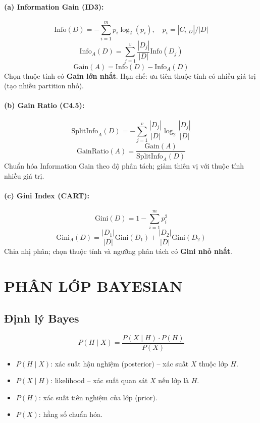 \documentclass[10pt]{article}
\begin{document}
\paragraph{(a) Information Gain (ID3):}
\[
\text{Info}(D) = -\sum_{i=1}^{m} p_i \log_2(p_i), \quad p_i = |C_{i,D}|/|D|
\]
\[
\text{Info}_A(D) = \sum_{j=1}^{v} \frac{|D_j|}{|D|} \text{Info}(D_j)
\]
\[
\text{Gain}(A) = \text{Info}(D) - \text{Info}_A(D)
\]
Chọn thuộc tính có \textbf{Gain lớn nhất}. Hạn chế: ưu tiên thuộc tính có nhiều giá trị (tạo nhiều partition nhỏ).

\paragraph{(b) Gain Ratio (C4.5):}
\[
\text{SplitInfo}_A(D) = -\sum_{j=1}^{v} \frac{|D_j|}{|D|} \log_2\frac{|D_j|}{|D|}
\]
\[
\text{GainRatio}(A) = \frac{\text{Gain}(A)}{\text{SplitInfo}_A(D)}
\]
Chuẩn hóa Information Gain theo độ phân tách; giảm thiên vị với thuộc tính nhiều giá trị.

\paragraph{(c) Gini Index (CART):}
\[
\text{Gini}(D) = 1 - \sum_{i=1}^{m} p_i^2
\]
\[
\text{Gini}_A(D) = \frac{|D_1|}{|D|}\text{Gini}(D_1) + \frac{|D_2|}{|D|}\text{Gini}(D_2)
\]
Chia nhị phân; chọn thuộc tính và ngưỡng phân tách có \textbf{Gini nhỏ nhất}.

\section{PHÂN LỚP BAYESIAN}

\subsection{Định lý Bayes}

\[
P(H \mid X) = \frac{P(X \mid H) \cdot P(H)}{P(X)}
\]

\begin{itemize}
    \item $P(H \mid X)$: xác suất hậu nghiệm (posterior) -- xác suất $X$ thuộc lớp $H$.
    \item $P(X \mid H)$: likelihood -- xác suất quan sát $X$ nếu lớp là $H$.
    \item $P(H)$: xác suất tiên nghiệm của lớp (prior).
    \item $P(X)$: hằng số chuẩn hóa.
\end{itemize}
\end{document}
